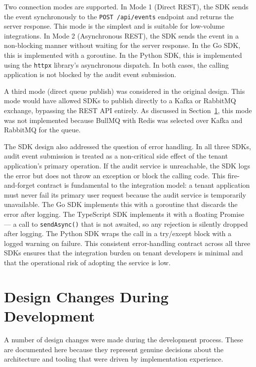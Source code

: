 \documentclass[a4paper,12pt,onecolumn]{report}
\begin{document}
Two connection modes are supported.
In Mode 1 (Direct REST), the SDK sends the event synchronously to the \texttt{POST /api/events} endpoint and returns the server response.
This mode is the simplest and is suitable for low-volume integrations.
In Mode 2 (Asynchronous REST), the SDK sends the event in a non-blocking manner without waiting for the server response.
In the Go SDK, this is implemented with a goroutine.
In the Python SDK, this is implemented using the \texttt{httpx} library's asynchronous dispatch.
In both cases, the calling application is not blocked by the audit event submission.

A third mode (direct queue publish) was considered in the original design.
This mode would have allowed SDKs to publish directly to a Kafka or RabbitMQ exchange, bypassing the REST API entirely.
As discussed in Section~\ref{sec:design-changes}, this mode was not implemented because BullMQ with Redis was selected over Kafka and RabbitMQ for the queue.

The SDK design also addressed the question of error handling.
In all three SDKs, audit event submission is treated as a non-critical side effect of the tenant application's primary operation.
If the audit service is unreachable, the SDK logs the error but does not throw an exception or block the calling code.
This fire-and-forget contract is fundamental to the integration model: a tenant application must never fail its primary user request because the audit service is temporarily unavailable.
The Go SDK implements this with a goroutine that discards the error after logging.
The TypeScript SDK implements it with a floating Promise --- a call to \texttt{sendAsync()} that is not awaited, so any rejection is silently dropped after logging.
The Python SDK wraps the call in a try/except block with a logged warning on failure.
This consistent error-handling contract across all three SDKs ensures that the integration burden on tenant developers is minimal and that the operational risk of adopting the service is low.

\section{Design Changes During Development}
\label{sec:design-changes}

A number of design changes were made during the development process.
These are documented here because they represent genuine decisions about the architecture and tooling that were driven by implementation experience.
\end{document}
